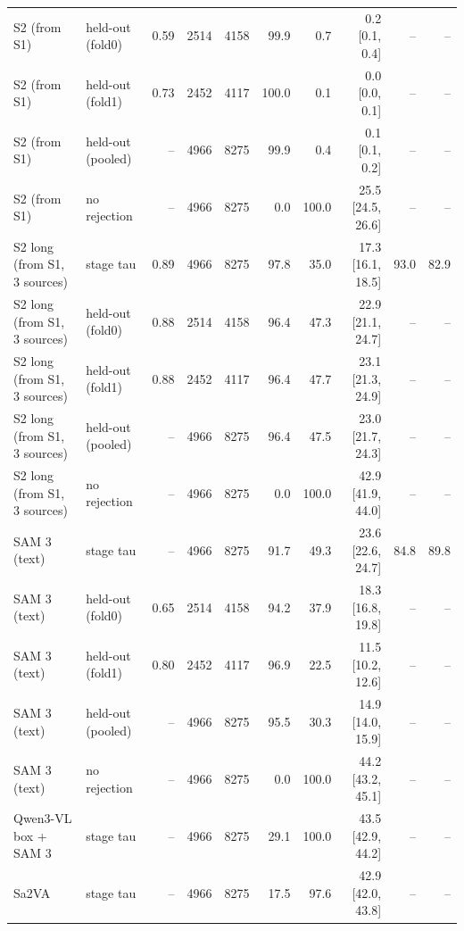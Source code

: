 \begin{tabular}{llrrrrrrrr}
S2 (from S1) & held-out (fold0) & 0.59 & 2514 & 4158 & 99.9 & 0.7 & 0.2 \scriptsize{[0.1, 0.4]} & -- & -- \\
S2 (from S1) & held-out (fold1) & 0.73 & 2452 & 4117 & 100.0 & 0.1 & 0.0 \scriptsize{[0.0, 0.1]} & -- & -- \\
S2 (from S1) & held-out (pooled) & -- & 4966 & 8275 & 99.9 & 0.4 & 0.1 \scriptsize{[0.1, 0.2]} & -- & -- \\
S2 (from S1) & no rejection & -- & 4966 & 8275 & 0.0 & 100.0 & 25.5 \scriptsize{[24.5, 26.6]} & -- & -- \\
\midrule
S2 long (from S1, 3 sources) & stage tau & 0.89 & 4966 & 8275 & 97.8 & 35.0 & 17.3 \scriptsize{[16.1, 18.5]} & 93.0 & 82.9 \\
S2 long (from S1, 3 sources) & held-out (fold0) & 0.88 & 2514 & 4158 & 96.4 & 47.3 & 22.9 \scriptsize{[21.1, 24.7]} & -- & -- \\
S2 long (from S1, 3 sources) & held-out (fold1) & 0.88 & 2452 & 4117 & 96.4 & 47.7 & 23.1 \scriptsize{[21.3, 24.9]} & -- & -- \\
S2 long (from S1, 3 sources) & held-out (pooled) & -- & 4966 & 8275 & 96.4 & 47.5 & 23.0 \scriptsize{[21.7, 24.3]} & -- & -- \\
S2 long (from S1, 3 sources) & no rejection & -- & 4966 & 8275 & 0.0 & 100.0 & 42.9 \scriptsize{[41.9, 44.0]} & -- & -- \\
\midrule
SAM 3 (text) & stage tau & -- & 4966 & 8275 & 91.7 & 49.3 & 23.6 \scriptsize{[22.6, 24.7]} & 84.8 & 89.8 \\
SAM 3 (text) & held-out (fold0) & 0.65 & 2514 & 4158 & 94.2 & 37.9 & 18.3 \scriptsize{[16.8, 19.8]} & -- & -- \\
SAM 3 (text) & held-out (fold1) & 0.80 & 2452 & 4117 & 96.9 & 22.5 & 11.5 \scriptsize{[10.2, 12.6]} & -- & -- \\
SAM 3 (text) & held-out (pooled) & -- & 4966 & 8275 & 95.5 & 30.3 & 14.9 \scriptsize{[14.0, 15.9]} & -- & -- \\
SAM 3 (text) & no rejection & -- & 4966 & 8275 & 0.0 & 100.0 & 44.2 \scriptsize{[43.2, 45.1]} & -- & -- \\
\midrule
Qwen3-VL box + SAM 3 & stage tau & -- & 4966 & 8275 & 29.1 & 100.0 & 43.5 \scriptsize{[42.9, 44.2]} & -- & -- \\
\midrule
Sa2VA & stage tau & -- & 4966 & 8275 & 17.5 & 97.6 & 42.9 \scriptsize{[42.0, 43.8]} & -- & -- \\
\bottomrule
\end{tabular}
